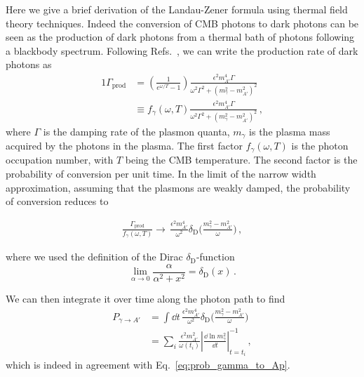 \documentclass[prd,aps,10pt,nofootinbib,twocolumn,superscriptaddress,preprintnumbers,balancelastpage,longbibliography]{revtex4-1}
\begin{document}
Here we give a brief derivation of the Landau-Zener formula using thermal field theory techniques. Indeed the conversion of CMB photons to dark photons can be seen as the production of dark photons from a thermal bath of photons following a blackbody spectrum. Following Refs.~\cite{Arias:2012az, Redondo:2013lna,Hardy:2016kme}, we can write the production rate of dark photons as 
\begin{alignat}{1}
\Gamma_{\mathrm{prod}} &= \left(\frac{1}{e^{\omega / T} - 1} \right) \frac{\epsilon^2 m_{A'}^4 \Gamma}{\omega^2 \Gamma^2 + (m_{\gamma}^2 - m_{A'}^2)^2} \, \nonumber \\ 
&\equiv f_\gamma(\omega,T)  \frac{\epsilon^2 m_{A'}^4 \Gamma}{\omega^2 \Gamma^2 + (m_{\gamma}^2 - m_{A'}^2)^2} \,,
\end{alignat}
where $\Gamma$ is the damping rate of the plasmon quanta, $m_{\gamma}$ is the plasma mass acquired by the photons in the plasma. The first factor $f_\gamma(\omega,T)$ is the photon occupation number, with $T$ being the CMB temperature. The second factor is the probability of conversion per unit time. 
In the limit of the narrow width approximation, assuming that the plasmons are weakly damped, the probability of conversion reduces to 

\begin{align}
\frac{\Gamma_{\mathrm{prod}}}{f_\gamma(\omega,T)} \rightarrow \, \frac{\epsilon^2 m_{A'}^4}{\omega^2} \delta_\text{D}\Big(\frac{m_{\gamma}^2 - m_{A'}^2}{\omega}   \Big) \,, 
\end{align}

where we used the definition of the Dirac $\delta_\text{D}$-function 
\begin{equation}
\lim_{\alpha \rightarrow 0} \frac{\alpha}{\alpha^2 +x^2} = \delta_\text{D}(x) \,.
\end{equation}

We can then integrate it over time along the photon path to find
\begin{align}
P_{\gamma \rightarrow A'} &= \int \dd t \, \frac{\epsilon^2 m_{A'}^4}{\omega^2} \delta_\text{D}\Big(\frac{m_{\gamma}^2 - m_{A'}^2}{\omega}   \Big) \nonumber \\ 
&= \sum_i  \frac{\epsilon^2 m_{A'}^2}{\omega(t_i)} \left| \frac{\dd\ln m_{\gamma}^2}{\dd t} \right|^{-1}_{t = t_i} \,,
\end{align}
which is indeed in agreement with Eq.~\eqref{eq:prob_gamma_to_Ap}.



\end{document}
